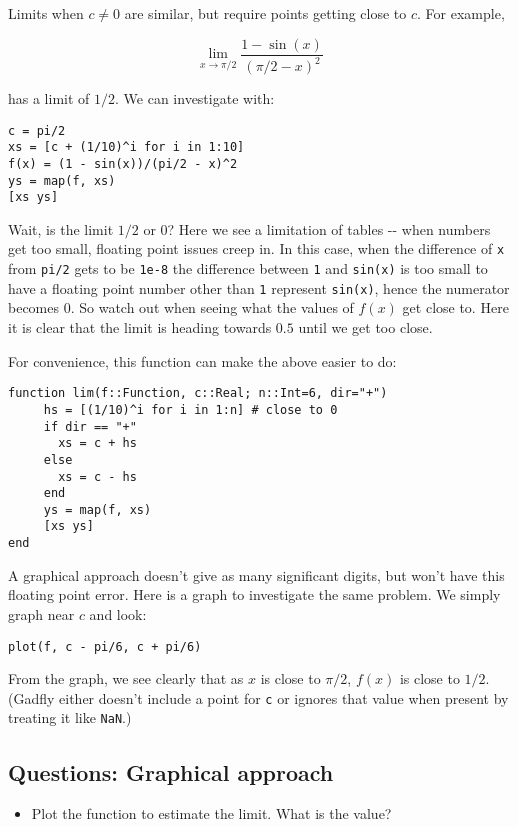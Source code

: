 \documentclass[12pt]{article}
\begin{document}
Limits when $c\neq 0$ are similar, but require points getting close to
$c$. For example,

\[
\lim_{x \rightarrow \pi/2} \frac{1 - \sin(x)}{(\pi/2 - x)^2}
\]

has a limit of $1/2$. We can investigate with:



\begin{verbatim}
c = pi/2
xs = [c + (1/10)^i for i in 1:10]
f(x) = (1 - sin(x))/(pi/2 - x)^2
ys = map(f, xs)
[xs ys]
\end{verbatim}
Wait, is the limit $1/2$ or $0$? Here we see a limitation of tables -{}-
when numbers get too small, floating point issues creep in. In this
case, when the difference of \texttt{x} from \texttt{pi/2} gets to be
\texttt{1e-8} the difference between \texttt{1} and \texttt{sin(x)} is
too small to have a floating point number other than \texttt{1}
represent \texttt{sin(x)}, hence the numerator becomes $0$. So watch out
when seeing what the values of $f(x)$ get close to. Here it is clear
that the limit is heading towards $0.5$ until we get too close.

For convenience, this function can make the above easier to do:



\begin{verbatim}
function lim(f::Function, c::Real; n::Int=6, dir="+")
     hs = [(1/10)^i for i in 1:n] # close to 0
     if dir == "+"
       xs = c + hs 
     else
       xs = c - hs
     end
     ys = map(f, xs)
     [xs ys]
end
\end{verbatim}
A graphical approach doesn't give as many significant digits, but won't
have this floating point error. Here is a graph to investigate the same
problem. We simply graph near $c$ and look:



\begin{verbatim}
plot(f, c - pi/6, c + pi/6)
\end{verbatim}
From the graph, we see clearly that as $x$ is close to $\pi/2$, $f(x)$
is close to $1/2$. (Gadfly either doesn't include a point for \texttt{c}
or ignores that value when present by treating it like \texttt{NaN}.)

\subsection{Questions: Graphical approach}

\begin{itemize}
\itemsep1pt\parskip0pt
\item
  Plot the function to estimate the limit. What is the value?
\end{itemize}
\end{document}
